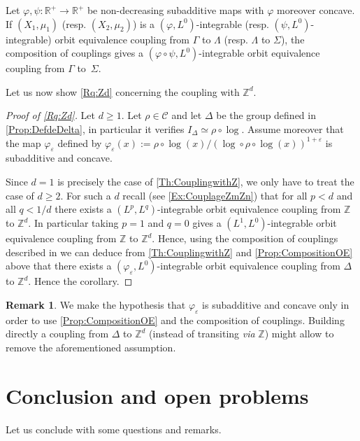 \documentclass[english, 11pt, a4paper]{article}
\theoremstyle{definition}
\newtheorem{Rq}[Def]{Remark}
\numberwithin{equation}{section}
\newcommand{\bZ}{\mathbb{Z}}
\newcommand{\bR}{\mathbb{R}}
\newcommand{\calC}{\mathcal{C}}
\newcommand{\BZ}{\Delta}
\newcommand{\profile}{I}
\begin{document}
\begin{Prop}\label{Prop:CompositionOE}
Let $\varphi,\psi:\bR^+\rightarrow \bR^+$ be non-decreasing subadditive maps with
$\varphi$ moreover concave.
If $(X_1,\mu_1)$ (resp. $(X_2,\mu_2)$) is a $(\varphi,L^0)$-integrable (resp.
$(\psi,L^0)$-integrable) orbit equivalence coupling from $\Gamma$ to $\Lambda$
(resp. $\Lambda$ to $\Sigma$), the composition of couplings gives a $(\varphi
\circ \psi,L^0)$-integrable orbit equivalence coupling from $\Gamma$
to~$\Sigma$.
\end{Prop}
Let us now show \cref{Rq:Zd} concerning the coupling with $\bZ^d$.
\begin{proof}[Proof of \cref{Rq:Zd}]\label{DemoCorollaire}
  Let $d \geq 1$. Let $\rho \in \calC$ and let $\BZ$ be the
  group defined in \cref{Prop:DefdeDelta}, in particular it verifies
  $\profile_{\BZ}\simeq \rho \circ \log$.
  Assume moreover that the map $\varphi_\varepsilon$ defined by $\varphi_{\varepsilon}(x):={\rho\circ
  \log(x)}/{\left( \log\circ\rho\circ\log(x) \right)^{1+\varepsilon}}$ is subadditive and concave.

  Since $d=1$ is precisely the case of \cref{Th:CouplingwithZ},
  we only have to treat the case of $d\geq 2$. For such a $d$ recall (see \cref{Ex:CouplageZmZn})
  that for all $p<d$ and
  all $q<1/d$ there exists a $(L^p,L^{q})$-integrable orbit equivalence coupling from
  $\bZ$ to $\bZ^d$. In particular taking $p=1$ and $q=0$ gives a $(L^1,L^{0})$-integrable orbit
  equivalence coupling from $\bZ$ to $\bZ^d$.
  Hence, using the composition of couplings described in \cite{DKLMT} 
  we can deduce from \cref{Th:CouplingwithZ} and \cref{Prop:CompositionOE} above
  that there exists a
  $(\varphi_{\varepsilon},L^0)$-integrable orbit equivalence coupling
  from $\BZ$ to $\bZ^d$. 
Hence the corollary.
\end{proof}
\begin{Rq}
We make the hypothesis that $\varphi_\varepsilon$ is subadditive and concave
only in order to use \cref{Prop:CompositionOE} and the composition of couplings. Building directly a coupling from $\BZ$ to $\bZ^d$ (instead of transiting \emph{via} $\bZ$)
might allow to remove the aforementioned assumption.
\end{Rq}

\newpage
\section{Conclusion and open problems}\label{Sec:Conclusion}
Let us conclude with some questions and remarks.
\end{document}
